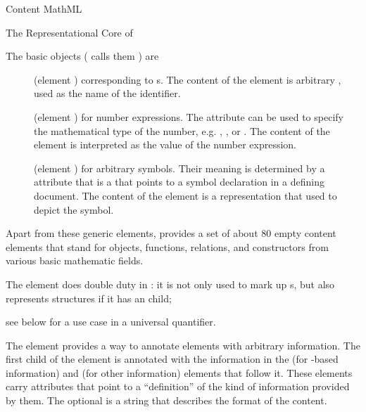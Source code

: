 \begin{omgroup}[id=mobj,short=Mathematical Objects]
\begin{omgroup}[id=cmml]{Content MathML}
\begin{module}[id=cMathML]
\begin{omgroup}[id=mathml-core]{The Representational Core of {\cmathml}}
\begin{definition}[display=flow,id=mml.basic.def]
  The basic objects ({\mathml} calls them ) are
\begin{description}
  \item[{}] (element ) corresponding to
    {s}. The content of the {} element is
    arbitrary {\pmathml}, used as the name of the identifier.
  \item[{}] (element ) for number
    expressions. The attribute {} can be used to specify the
    mathematical type of the number, e.g. {}, {}, or
    {}. The content of the {} element is
    interpreted as the value of the number expression.
  \item[{}] (element ) for arbitrary
    symbols.  Their meaning is determined by a {} attribute that
    is a {} that points to a symbol declaration in a defining
    document. The content of the {} element is a {\pmathml}
    representation that used to depict the symbol.
  \end{description}
\end{definition}

Apart from these generic elements, {\cmathml} provides a set of about 80 empty
content elements that stand for objects, functions, relations, and constructors
from various basic mathematic fields.

\begin{definition}[id=apply.def]
  The {} element does double duty in {\cmathml}: it is not only
  used to mark up {s}, but also represents {}
  structures if it has an {} child;
\end{definition}
see {} below for a use case in a universal quantifier.

\begin{definition}[id=semantics.def]
  The {} element provides a way to annotate {\cmathml} elements
  with arbitrary information. The first child of the {}
  element is annotated with the information in the {} (for
  {\xml}-based information) and {} (for other information)
  elements that follow it. These elements carry
  {} attributes that point to a
  ``definition'' of the kind of information provided by them. The optional
  {} is a string that describes the format of
  the content.
\end{definition}
\end{omgroup}


\end{module}
\end{omgroup}
\end{omgroup}
